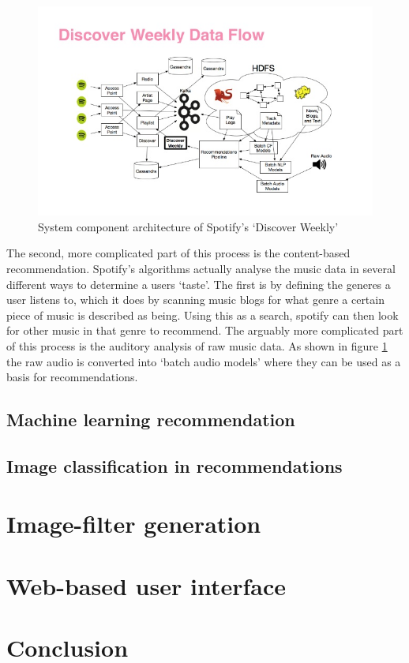 \documentclass[a4paper,12pt]{article}
\begin{document}
      \begin{figure}[ht]
        \centering
        \includegraphics[width=\linewidth]{images/discoverweekly-dataflow}
        \caption[System component architecture of Spotify's ‘Discover Weekly’]{System component architecture of Spotify's ‘Discover Weekly’ \protect\citep{johnson2015dw}}
        \label{fig:discoverweekly-dataflow}
      \end{figure}

      The second, more complicated part of this process is the content-based recommendation. Spotify's algorithms actually analyse the music data in several different ways to determine a users ‘taste’. The first is by defining the generes a user listens to, which it does by scanning music blogs for what genre a certain piece of music is described as being. Using this as a search, spotify can then look for other music in that genre to recommend. The arguably more complicated part of this process is the auditory analysis of raw music data. As shown in figure \ref{fig:discoverweekly-dataflow} the raw audio is converted into ‘batch audio models’ where they can be used as a basis for recommendations.

  \subsection{Machine learning recommendation}
  \subsection{Image classification in recommendations}

\section{Image-filter generation}

\section{Web-based user interface}

\section{Conclusion}

\newpage
\singlespacing



\end{document}
